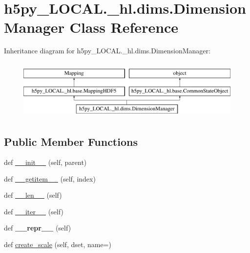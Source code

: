 \hypertarget{classh5py__LOCAL_1_1__hl_1_1dims_1_1DimensionManager}{}\section{h5py\+\_\+\+L\+O\+C\+A\+L.\+\_\+hl.\+dims.\+Dimension\+Manager Class Reference}
\label{classh5py__LOCAL_1_1__hl_1_1dims_1_1DimensionManager}
Inheritance diagram for h5py\+\_\+\+L\+O\+C\+A\+L.\+\_\+hl.\+dims.\+Dimension\+Manager\+:\begin{figure}[H]
\begin{center}
\leavevmode
\includegraphics[height=3.000000cm]{classh5py__LOCAL_1_1__hl_1_1dims_1_1DimensionManager}
\end{center}
\end{figure}
\subsection*{Public Member Functions}
\begin{DoxyCompactItemize}
\item 
def \hyperlink{classh5py__LOCAL_1_1__hl_1_1dims_1_1DimensionManager_a05fde4aa87197fa5935077dbb51ac136}{\+\_\+\+\_\+init\+\_\+\+\_\+} (self, parent)
\item 
def \hyperlink{classh5py__LOCAL_1_1__hl_1_1dims_1_1DimensionManager_a80da0f9fa34dd1db6e52ba64f5c114ea}{\+\_\+\+\_\+getitem\+\_\+\+\_\+} (self, index)
\item 
def \hyperlink{classh5py__LOCAL_1_1__hl_1_1dims_1_1DimensionManager_a98a78b937aec80844d53e47d734823a0}{\+\_\+\+\_\+len\+\_\+\+\_\+} (self)
\item 
def \hyperlink{classh5py__LOCAL_1_1__hl_1_1dims_1_1DimensionManager_a5ed323c32d99424db12f2c5c30d11ca4}{\+\_\+\+\_\+iter\+\_\+\+\_\+} (self)
\item 
\mbox{\label{classh5py__LOCAL_1_1__hl_1_1dims_1_1DimensionManager_a6c8bfb90a329d7e745889a552a913595}} 
def {\bfseries \+\_\+\+\_\+repr\+\_\+\+\_\+} (self)
\item 
def \hyperlink{classh5py__LOCAL_1_1__hl_1_1dims_1_1DimensionManager_ab57c0677bed53187340f92a97a255773}{create\+\_\+scale} (self, dset, name=\textquotesingle{}\textquotesingle{})
\end{DoxyCompactItemize}


